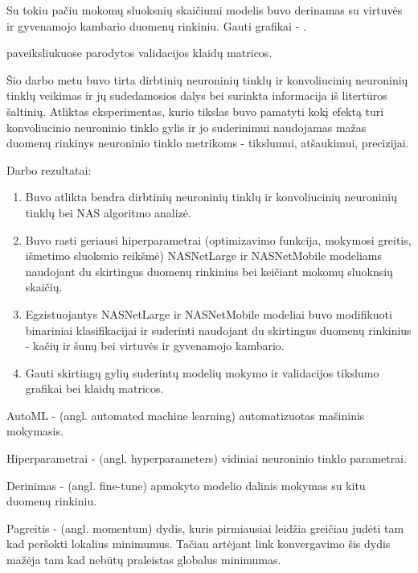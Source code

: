 \documentclass{VUMIFPSbakalaurinis}
\begin{document}
Su tokiu pačiu mokomų sluoksnių skaičiumi modelis buvo derinamas su virtuvės ir gyvenamojo kambario duomenų rinkiniu. Gauti grafikai - .

paveiksliukuose parodytos validacijos klaidų matricos. 

Šio darbo metu buvo tirta dirbtinių neuroninių tinklų ir konvoliucinių neuroninių tinklų veikimas 
ir jų sudedamosios dalys bei surinkta informacija iš litertūros šaltinių. Atliktas eksperimentas, 
kurio tikslas buvo pamatyti kokį efektą turi konvoliucinio neuroninio tinklo gylis ir jo suderinimui 
naudojamas mažas duomenų rinkinys neuroninio tinklo metrikoms - tikslumui, atšaukimui, precizijai.

Darbo rezultatai:
\begin{enumerate}
    \item Buvo atlikta bendra dirbtinių neuroninių tinklų ir konvoliucinių neuroninių tinklų bei NAS algoritmo analizė.
    \item Buvo rasti geriausi hiperparametrai (optimizavimo funkcija, mokymosi greitis, išmetimo sluoksnio reikšmė) NASNetLarge ir NASNetMobile modeliams naudojant du skirtingus duomenų rinkinius bei keičiant mokomų sluoknsių skaičių.
    \item Egzistuojantys NASNetLarge ir NASNetMobile modeliai buvo modifikuoti binariniai klasifikacijai ir suderinti naudojant du skirtingus duomenų rinkinius - kačių ir šunų bei virtuvės ir gyvenamojo kambario.
    \item Gauti skirtingų gylių suderintų modelių mokymo ir validacijos tikslumo grafikai bei klaidų matricos.
\end{enumerate}


\printbibliography[heading=bibintoc]

AutoML - (angl. automated machine learning) automatizuotas mašininis mokymasis.

Hiperparametrai - (angl. hyperparameters) vidiniai neuroninio tinklo parametrai.

Derinimas - (angl. fine-tune) apmokyto modelio dalinis mokymas su kitu duomenų rinkiniu.

Pagreitis - (angl. momentum) dydis, kuris pirmiausiai leidžia greičiau judėti tam kad peršokti lokalius minimumus. Tačiau artėjant link konvergavimo šis dydis mažėja tam kad nebūtų praleistas globalus minimumas. 

\appendix
\end{document}
